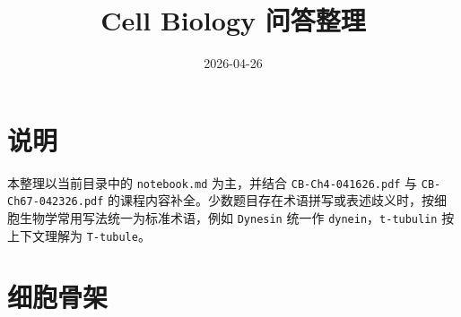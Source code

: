 \documentclass[12pt,fontset=none]{ctexart}
\title{Cell Biology 问答整理}
\author{}
\date{2026-04-26}
\begin{document}
\maketitle
\tableofcontents
\newpage

\section*{说明}
本整理以当前目录中的 \texttt{notebook.md} 为主，并结合 \texttt{CB-Ch4-041626.pdf} 与 \texttt{CB-Ch67-042326.pdf} 的课程内容补全。少数题目存在术语拼写或表述歧义时，按细胞生物学常用写法统一为标准术语，例如 \texttt{Dynesin} 统一作 \texttt{dynein}，\texttt{t-tubulin} 按上下文理解为 \texttt{T-tubule}。

\section*{细胞骨架}
\end{document}
